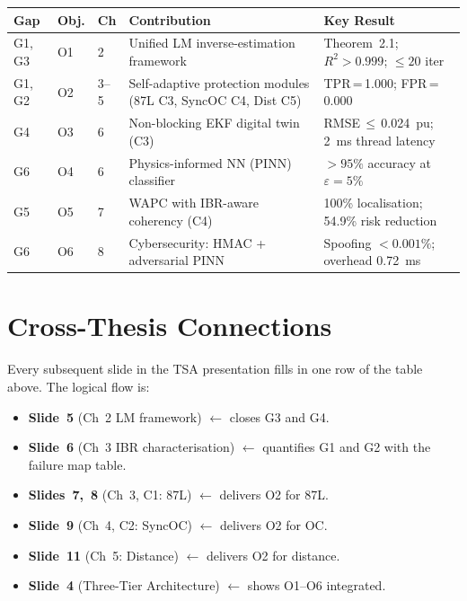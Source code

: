 \documentclass[12pt,a4paper]{article}
\begin{document}
\begin{center}
\small
\begin{tabularx}{\linewidth}{@{}llllX@{}}
\toprule
\textbf{Gap} & \textbf{Obj.} & \textbf{Ch} & \textbf{Contribution} & \textbf{Key Result} \\
\midrule
G1, G3 & O1 & 2   & Unified LM inverse-estimation framework & Theorem~2.1; $R^2 > 0.999$; $\leq 20$ iter \\
G1, G2 & O2 & 3--5 & Self-adaptive protection modules (87L C3, SyncOC C4, Dist C5) & TPR\,=\,1.000; FPR\,=\,0.000 \\
G4     & O3 & 6   & Non-blocking EKF digital twin (C3)      & RMSE\,$\leq$\,0.024~pu; 2~ms thread latency \\
G6     & O4 & 6   & Physics-informed NN (PINN) classifier   & $>95\%$ accuracy at $\varepsilon=5\%$ \\
G5     & O5 & 7   & WAPC with IBR-aware coherency (C4)      & 100\% localisation; 54.9\% risk reduction \\
G6     & O6 & 8   & Cybersecurity: HMAC + adversarial PINN  & Spoofing $<0.001\%$; overhead 0.72~ms \\
\bottomrule
\end{tabularx}
\end{center}

\section{Cross-Thesis Connections}

Every subsequent slide in the TSA presentation fills in one row of the table
above.  The logical flow is:
\begin{itemize}[nosep]
  \item \textbf{Slide~5} (Ch~2 LM framework) $\leftarrow$ closes G3 and G4.
  \item \textbf{Slide~6} (Ch~3 IBR characterisation) $\leftarrow$ quantifies G1
        and G2 with the failure map table.
  \item \textbf{Slides~7,~8} (Ch~3, C1: 87L) $\leftarrow$ delivers O2 for 87L.
  \item \textbf{Slide~9} (Ch~4, C2: SyncOC) $\leftarrow$ delivers O2 for OC.
  \item \textbf{Slide~11} (Ch~5: Distance) $\leftarrow$ delivers O2 for distance.
  \item \textbf{Slide~4} (Three-Tier Architecture) $\leftarrow$ shows O1--O6 integrated.
\end{itemize}
\end{document}
